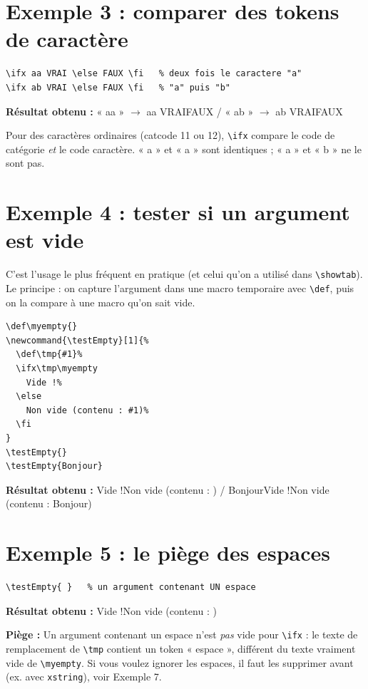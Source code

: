 \documentclass{article}
\newcommand{\Resultat}[1]{{\color{blue!60!black}\textbf{Résultat obtenu :} #1}\par}
\newcommand{\Piege}[1]{{\color{red!70!black}\textbf{Piège :} #1}\par}
\begin{document}
\section{Exemple 3 : comparer des tokens de caractère}
\begin{verbatim}
\ifx aa VRAI \else FAUX \fi   % deux fois le caractere "a"
\ifx ab VRAI \else FAUX \fi   % "a" puis "b"
\end{verbatim}

\Resultat{« aa » $\to$ \ifx aa VRAI\else FAUX\fi
\quad / \quad « ab » $\to$ \ifx ab VRAI\else FAUX\fi}

\noindent
Pour des caractères ordinaires (catcode 11 ou 12), \texttt{\textbackslash ifx}
compare le code de catégorie \emph{et} le code caractère. « a » et « a » sont
identiques ; « a » et « b » ne le sont pas.

\section{Exemple 4 : tester si un argument est vide}
C'est l'usage le plus fréquent en pratique (et celui qu'on a utilisé dans
\texttt{\textbackslash showtab}). Le principe : on capture l'argument dans une
macro temporaire avec \texttt{\textbackslash def}, puis on la compare à une
macro qu'on sait vide.

\begin{verbatim}
\def\myempty{}
\newcommand{\testEmpty}[1]{%
  \def\tmp{#1}%
  \ifx\tmp\myempty
    Vide !%
  \else
    Non vide (contenu : #1)%
  \fi
}
\testEmpty{}
\testEmpty{Bonjour}
\end{verbatim}

\def\myempty{}
\newcommand{\testEmpty}[1]{\def\tmp{#1}\ifx\tmp\myempty Vide !\else Non vide (contenu : #1)\fi}
\Resultat{\testEmpty{} \quad / \quad \testEmpty{Bonjour}}

\section{Exemple 5 : le piège des espaces}
\begin{verbatim}
\testEmpty{ }   % un argument contenant UN espace
\end{verbatim}

\Resultat{\testEmpty{ }}

\Piege{Un argument contenant un espace n'est \emph{pas} vide pour
\texttt{\textbackslash ifx} : le texte de remplacement de
\texttt{\textbackslash tmp} contient un token « espace », différent du texte
vraiment vide de \texttt{\textbackslash myempty}. Si vous voulez ignorer les
espaces, il faut les supprimer avant (ex. avec \texttt{xstring}), voir
Exemple 7.}
\end{document}
